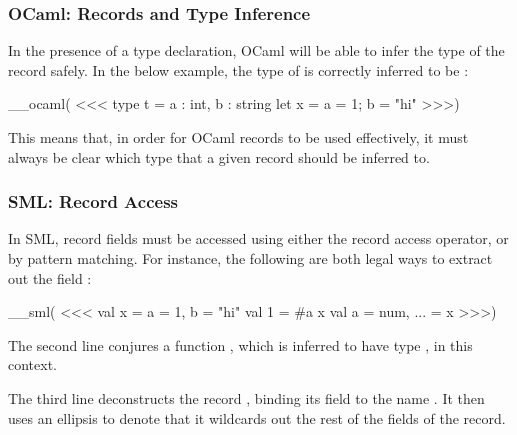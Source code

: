 \documentclass[aspectratio=169, handout]{beamer}
\begin{document}
\begin{frame}[fragile]
  \frametitle{OCaml: Records and Type Inference}

  In the presence of a type declaration, OCaml will be able to infer the type
  of the record safely. In the below example, the type of  is correctly
  inferred to be :

  \vspace{\fill}

__ocaml(
<<<
type t = {a : int, b : string}
let x = {a = 1; b = "hi"}
>>>)

  \vspace{\fill}

  This means that, in order for OCaml records to be used effectively, it must
  always be clear which type that a given record should be inferred to.

  \vspace{\fill}

\end{frame}

\begin{frame}[fragile]
  \frametitle{SML: Record Access}

  In SML, record fields must be accessed using either the record access operator,
  or by pattern matching. For instance, the following are both legal ways to
  extract out the field :

  \vspace{\fill}

__sml(
<<<
  val x = {a = 1, b = "hi"}
  val 1 = #a x
  val {a = num, ...} = x
>>>)

  \vspace{\fill}

  The second line conjures a function , which is inferred to have type
  , in this context.

  \vspace{\fill}

  The third line deconstructs the record , binding its field  to
  the name . It then uses an ellipsis to denote that it wildcards out
  the rest of the fields of the record.
\end{frame}
\end{document}
